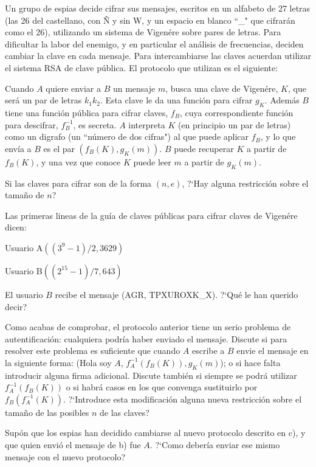 \begin{problem}[5]
Un grupo de espias decide cifrar sus mensajes, escritos en
un alfabeto de 27 letras (las 26 del castellano, con Ñ y sin W, y
un espacio en blanco ``\_" que cifrarán como el 26), utilizando un
sistema de Vigenére sobre pares de letras. Para dificultar la
labor del enemigo, y en particular el análisis de frecuencias,
deciden cambiar la clave en cada mensaje. Para intercambiarse las
claves acuerdan utilizar el sistema RSA de clave pública. El
protocolo que utilizan es el siguiente:

Cuando $A$ quiere enviar a $B$ un mensaje $m$, busca una clave de
Vigenére, $K$, que será un par de letras $k_1k_2$. Esta clave le
da una función para cifrar $g_K$. Además $B$ tiene una función
pública para cifrar claves, $f_B$, cuya correspondiente función
para descifrar, $f^{-1}_B$, es secreta. $A$ interpreta $K$ (en
principio un par de letras) como un digrafo (un ``número de dos
cifras") al que puede aplicar $f_B$, y lo que envía a $B$ es el
par $(f_B(K),g_K(m))$. $B$ puede recuperar $K$ a partir de
$f_B(K)$, y una vez que conoce $K$ puede leer $m$ a partir de
$g_K(m)$.

\ppart Si las claves para cifrar son de la forma $(n,e)$, ?`Hay alguna
restricción sobre el tamaño de $n$?

\ppart Las primeras lineas de la guía de claves públicas para cifrar
claves de Vigenére dicen:

 Usuario
A\dotfill$((3^9-1)/2,3629)$


Usuario
B\dotfill$((2^{15}-1)/7,643)$\hphantom{$((3^9-1)/2,3629)$$((3^9-1)/2,3629)$}

 El usuario $B$ recibe el mensaje (AGR, TPXUROXK\_X). ?`Qué le han
querido decir?

\ppart Como acabas de comprobar, el protocolo anterior tiene un serio
problema de autentificación: cualquiera podría haber enviado el
mensaje. Discute si para resolver este problema es suficiente que
cuando $A$ escribe a $B$ envie el mensaje en la siguiente forma:
(Hola soy $A$, $f^{-1}_A(f_B(K)),g_K(m)$); o si hace falta
introducir alguna firma adicional. Discute también si siempre se
podrá utilizar $f^{-1}_A(f_B(K))$ o si habrá casos en los que
convenga sustituirlo por $f_B(f^{-1}_A(K))$. ?`Introduce esta
modificación alguna nueva restricción sobre el tamaño de las
posibles $n$ de las claves?

\ppart Supón que los espias han decidido cambiarse al nuevo protocolo
descrito en c), y que quien envió el mensaje de b) fue $A$. ?`Como
debería enviar ese mismo mensaje con el nuevo protocolo?
\solution


\end{problem}

